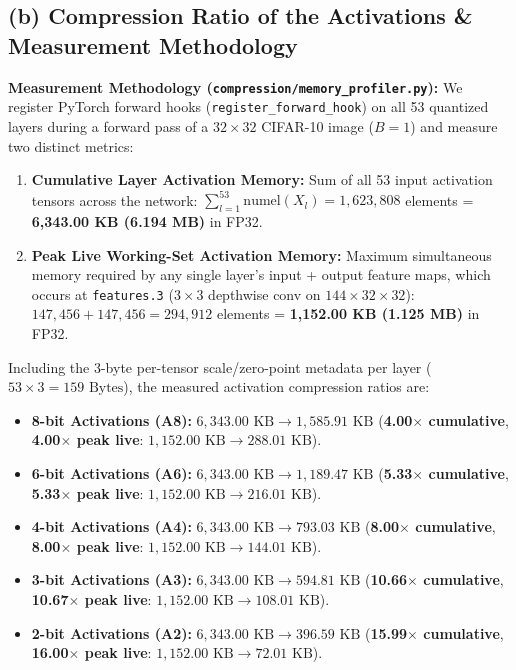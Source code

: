 \documentclass[11pt,a4paper]{article}
\begin{document}
\subsection*{(b) Compression Ratio of the Activations \& Measurement Methodology}
\textbf{Measurement Methodology (\texttt{compression/memory\_profiler.py}):}
We register PyTorch forward hooks (\texttt{register\_forward\_hook}) on all 53 quantized layers during a forward pass of a $32\times 32$ CIFAR-10 image ($B=1$) and measure two distinct metrics:
\begin{enumerate}\setlength\itemsep{1pt}
    \item \textbf{Cumulative Layer Activation Memory:} Sum of all 53 input activation tensors across the network: $\sum_{l=1}^{53} \text{numel}(X_l) = 1,623,808$ elements = \textbf{6,343.00 KB (6.194 MB)} in FP32.
    \item \textbf{Peak Live Working-Set Activation Memory:} Maximum simultaneous memory required by any single layer's input + output feature maps, which occurs at \texttt{features.3} ($3\times 3$ depthwise conv on $144 \times 32 \times 32$): $147,456 + 147,456 = 294,912$ elements = \textbf{1,152.00 KB (1.125 MB)} in FP32.
\end{enumerate}
Including the 3-byte per-tensor scale/zero-point metadata per layer ($53 \times 3 = 159\text{ Bytes}$), the measured activation compression ratios are:
\begin{itemize}\setlength\itemsep{1pt}
    \item \textbf{8-bit Activations (A8):} $6,343.00\text{ KB} \to 1,585.91\text{ KB}$ (\textbf{4.00$\times$ cumulative}, \textbf{4.00$\times$ peak live}: $1,152.00\text{ KB} \to 288.01\text{ KB}$).
    \item \textbf{6-bit Activations (A6):} $6,343.00\text{ KB} \to 1,189.47\text{ KB}$ (\textbf{5.33$\times$ cumulative}, \textbf{5.33$\times$ peak live}: $1,152.00\text{ KB} \to 216.01\text{ KB}$).
    \item \textbf{4-bit Activations (A4):} $6,343.00\text{ KB} \to 793.03\text{ KB}$ (\textbf{8.00$\times$ cumulative}, \textbf{8.00$\times$ peak live}: $1,152.00\text{ KB} \to 144.01\text{ KB}$).
    \item \textbf{3-bit Activations (A3):} $6,343.00\text{ KB} \to 594.81\text{ KB}$ (\textbf{10.66$\times$ cumulative}, \textbf{10.67$\times$ peak live}: $1,152.00\text{ KB} \to 108.01\text{ KB}$).
    \item \textbf{2-bit Activations (A2):} $6,343.00\text{ KB} \to 396.59\text{ KB}$ (\textbf{15.99$\times$ cumulative}, \textbf{16.00$\times$ peak live}: $1,152.00\text{ KB} \to 72.01\text{ KB}$).
\end{itemize}
\end{document}
